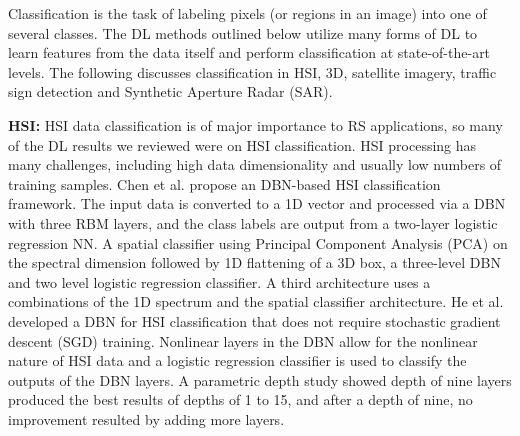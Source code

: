 \documentclass[12pt]{spieman}
\begin{document}
\begin{spacing}{1}

Classification is the task of labeling pixels (or regions in an image) into one of several classes. The DL methods outlined below utilize many forms of DL to learn features from the data itself and perform classification at state-of-the-art levels. The following discusses classification in HSI, 3D, satellite imagery, traffic sign detection and Synthetic Aperture Radar (SAR).

\textbf{HSI:} HSI data classification is of major importance to RS applications, so many of the DL results we reviewed were on HSI classification. HSI processing has many challenges, including high data dimensionality and usually low numbers of training samples. Chen et al. \cite{Chen2015SpectralSpatial} propose an DBN-based HSI classification framework. The input data is converted to a 1D vector and processed via a DBN with three RBM layers, and the class labels are output from a two-layer logistic regression NN. A spatial classifier using Principal Component Analysis (PCA) on the spectral dimension followed by 1D flattening of a 3D box, a three-level DBN and two level logistic regression classifier. A third architecture uses a combinations of the 1D spectrum and the spatial classifier architecture. He et al. \cite{He2016Hyperspectral} developed a DBN for HSI classification that does not require stochastic gradient descent (SGD) training. Nonlinear layers in the DBN allow for the nonlinear nature of HSI data and a logistic regression classifier is used to classify the outputs of the DBN layers. A parametric depth study showed depth of nine layers produced the best results of depths of 1 to 15, and after a depth of nine, no improvement resulted by adding more layers.


\end{spacing}
\end{document}

